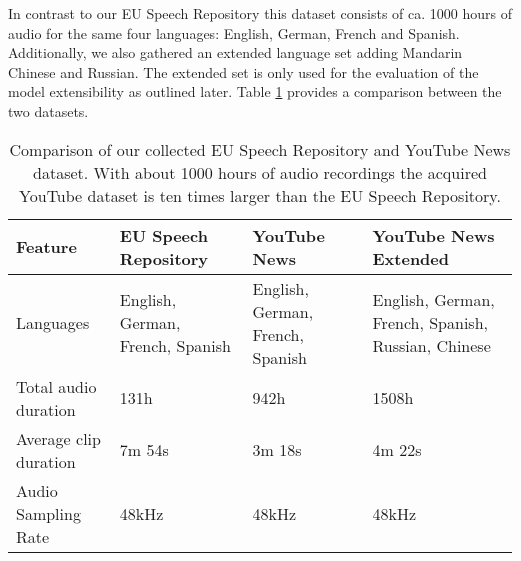  	In contrast to our EU Speech Repository this dataset consists of ca. 1000 hours of audio  for the same four languages: English, German, French and Spanish. Additionally, we also gathered an extended language set adding Mandarin Chinese and Russian. The extended set is only used for the evaluation of the model extensibility as outlined later. Table \ref{tab:dataset_comparison} provides a comparison between the two datasets.
  	
  	
\begin{table}[]
\centering
\begin{tabularx}{\textwidth}{lXXX}
\toprule
Feature               & EU Speech Repository & YouTube News & YouTube News \mbox{Extended} \\ 
\midrule
Languages             & English, German, French, Spanish & English, German, French, Spanish & English, German, French, Spanish, Russian, Chinese \\
Total audio duration  & 131h   & 942h   & 1508h   \\
Average clip duration & 7m 54s & 3m 18s & 4m 22s  \\
Audio Sampling Rate   & 48kHz  & 48kHz  & 48kHz   \\ 
\bottomrule
\end{tabularx}
\caption{Comparison of our collected EU Speech Repository and YouTube News dataset. With about 1000 hours of audio recordings the acquired YouTube dataset is ten times larger than the EU Speech Repository.}
\label{tab:dataset_comparison}
\end{table}



